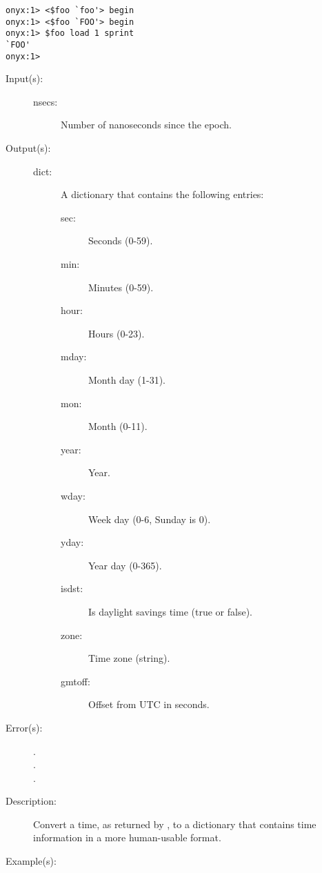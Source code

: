 \begin{description}
\begin{description}
\begin{verbatim}
onyx:1> <$foo `foo'> begin
onyx:1> <$foo `FOO'> begin
onyx:1> $foo load 1 sprint
`FOO'
onyx:1>
		\end{verbatim}
	\end{description}
\label{systemdict:localtime}
\item[{\onyxop{nsecs}{localtime}{dict}}: ]
	\begin{description}\item[]
	\item[Input(s): ]
		\begin{description}\item[]
		\item[nsecs: ]
			Number of nanoseconds since the epoch.
		\end{description}
	\item[Output(s): ]
		\begin{description}\item[]
		\item[dict: ]
			A dictionary that contains the following entries:
			\begin{description}\item[]
			\item[sec: ]
				Seconds (0-59).
			\item[min: ]
				Minutes (0-59).
			\item[hour: ]
				Hours (0-23).
			\item[mday: ]
				Month day (1-31).
			\item[mon: ]
				Month (0-11).
			\item[year: ]
				Year.
			\item[wday: ]
				Week day (0-6, Sunday is 0).
			\item[yday: ]
				Year day (0-365).
			\item[isdst: ]
				Is daylight savings time (true or false).
			\item[zone: ]
				Time zone (string).
			\item[gmtoff: ]
				Offset from UTC in seconds.
			\end{description}
		\end{description}
	\item[Error(s): ]
		\begin{description}\item[]
		\item[.]
		\item[.]
		\item[.]
		\end{description}
	\item[Description: ]
		Convert a time, as returned by
		, to a dictionary that
		contains time information in a more human-usable format.
	\item[Example(s): ]\begin{verbatim}


\end{verbatim}
\end{description}
\end{description}
